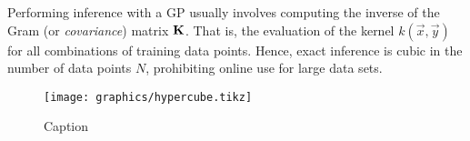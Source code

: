
Performing inference with a \ac{GP} usually involves computing the inverse of the Gram (or \emph{covariance}) matrix $\bm{\mathrm{K}}$.
That is, the evaluation of the kernel $k(\vec{x}, \vec{y})$ for all combinations of training data points.
Hence, exact inference is cubic in the number of data points $N$, prohibiting online use for large data sets\cite{rahimiRandomFeaturesLargeScale2007}.


\begin{figure}
	\centering
	\texttt{[image: graphics/hypercube.tikz]}
	\caption{Caption}
	\label{fig:hypercube}
\end{figure}
